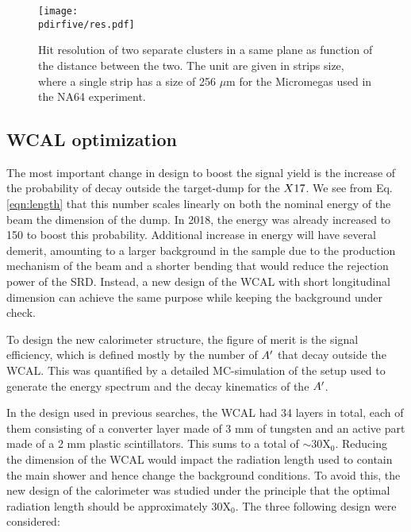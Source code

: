 \begin{figure}[tbh!]
  \centering
  \texttt{[image: \\pdirfive/res.pdf]}
  \caption[Hit resolution as function of the two cluster distance]{Hit resolution of two separate clusters in a same plane as function of the distance between the two. The unit are given in strips size, where a single strip has a size of 256 $\mu$m for the Micromegas used in the NA64 experiment.}
  \label{fig:res-hit}
\end{figure}

\subsection{WCAL optimization}
\label{ch5:sec:new-vismode-setup-wcal}

The most important change in design to boost the signal yield is the increase of the probability of decay outside the target-dump for the $X17$. We see from Eq.\ref{eqn:length} that this number scales linearly on both the nominal energy of the beam the dimension of the dump. In 2018, the energy was already increased to 150 \gev to boost this probability. Additional increase in energy will have several demerit, amounting to a larger background in the sample due to the production mechanism of the beam and a shorter bending that would reduce the rejection power of the SRD. Instead, a new design of the WCAL with short longitudinal dimension can achieve the same purpose while keeping the background under check.

To design the new calorimeter structure, the figure of merit is the signal efficiency, which is defined mostly by the number of $A'$ that decay outside the WCAL. This was quantified by a detailed MC-simulation of the setup used to generate the energy spectrum and the decay kinematics of the $A'$.

In the design used in previous searches, the WCAL had 34 layers in total, each of them consisting of a converter layer made of 3 mm of tungsten and an active part made of a 2 mm plastic scintillators. This sums to a total of $\sim$30X$_0$. Reducing the dimension of the WCAL would impact the radiation length used to contain the main shower and hence change the background conditions. To avoid this, the new design of the calorimeter was studied under the principle that the optimal radiation length should be approximately 30X$_0$. The three following design were considered:

